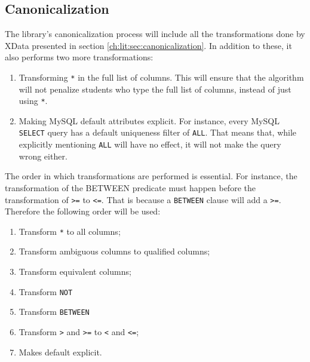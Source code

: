 \begin{tabularx}{\textwidth}{|c|Y|Y|}

\end{tabularx}

\subsection{Canonicalization} \label{ch:lit:sec:improved_canon}

The library's canonicalization process will include all the transformations done by XData presented in section \ref{ch:lit:sec:canonicalization}. In addition to these, it also performs two more transformations:
\begin{enumerate}
    \item Transforming \texttt{*} in the full list of columns. This will ensure that the algorithm will not penalize students who type the full list of columns, instead of just using  \texttt{*}.
    \item Making MySQL default attributes explicit. For instance, every MySQL \texttt{SELECT} query has a default uniqueness filter of \texttt{ALL}. That means that, while explicitly mentioning \texttt{ALL} will have no effect, it will not make the query wrong either.
\end{enumerate}

The order in which transformations are performed is essential. For instance, the transformation of the BETWEEN predicate must happen before the transformation of \texttt{>=} to \texttt{<=}. That is because a \texttt{BETWEEN} clause will add a \texttt{>=}. Therefore the following order will be used:
\begin{enumerate}
    \item Transform \texttt{*} to all columns;
    \item Transform ambiguous columns to qualified columns;
    \item Transform equivalent columns;
    \item Transform \texttt{NOT}
    \item Transform \texttt{BETWEEN}
    \item Transform \texttt{>} and \texttt{>=} to \texttt{<} and \texttt{<=};
    \item Makes default explicit.
\end{enumerate}

